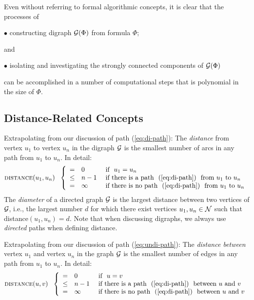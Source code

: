 \medskip

\noindent Even without referring to formal algorithmic concepts, it is clear that the processes of

$\bullet$ constructing digraph $\mbox{$\cal G$}(\Phi)$ from formula $\Phi$;

\noindent and

$\bullet$ isolating and investigating the strongly connected components of $\mbox{$\cal G$}(\Phi)$

\noindent
can be accomplished in a number of computational steps that is polynomial in the size of $\Phi$.  


\subsection{Distance-Related Concepts}

Extrapolating from our discussion of path (\ref{eq:di-path}): The {\it
  distance} from vertex $u_1$ to vertex $u_n$ in the digraph $\mbox{$\cal G$}$ is the
smallest number of arcs in any path from $u_1$ to $u_n$.  In detail:
\begin{equation}
\label{eq:di-distance-defn}
 \mbox{\sc distance}(u_1, u_n) \ \ \left\{
\begin{array}{cll}
= & 0 & \mbox{  if  } \ u_1 = u_n \\
\leq & n-1 & \mbox{  if there is a path } \ (\ref{eq:di-path})
\ \mbox{ from $u_1$ to $u_n$} \\
= & \infty & \mbox{  if there is no path } \ (\ref{eq:di-path})
\ \mbox{ from $u_1$ to $u_n$}
\end{array}
\right.
\end{equation}
The {\it diameter} 
 of a directed graph $\mbox{$\cal G$}$ is the largest
distance between two vertices of $\mbox{$\cal G$}$, i.e., the largest number $d$ for
which there exist vertices $u_1, u_n \in \mbox{$\cal N$}$ such that {\sc
  distance}$(u_1, u_n) = d$.  Note that when discussing digraphs, we
always use {\em directed} paths when defining distance.
\medskip

Extrapolating from our discussion of path (\ref{eq:undi-path}): The
{\it distance between} vertex $u_1$ and vertex $u_n$ in the graph $\mbox{$\cal G$}$ is
the smallest number of edges in any path from $u_1$ to $u_n$.  In
detail:
\begin{equation}
\label{eq:distance-defn}
 \mbox{\sc distance}(u, v) \ \ \left\{
\begin{array}{cll}
= & 0 & \mbox{  if  } \ u = v \\
\leq & n-1 & \mbox{  if there is a path } \ (\ref{eq:di-path})
\ \mbox{ between $u$ and $v$} \\
= & \infty & \mbox{  if there is no path } \ (\ref{eq:di-path})
\ \mbox{ between $u$ and $v$}
\end{array}
\right.
\end{equation}

